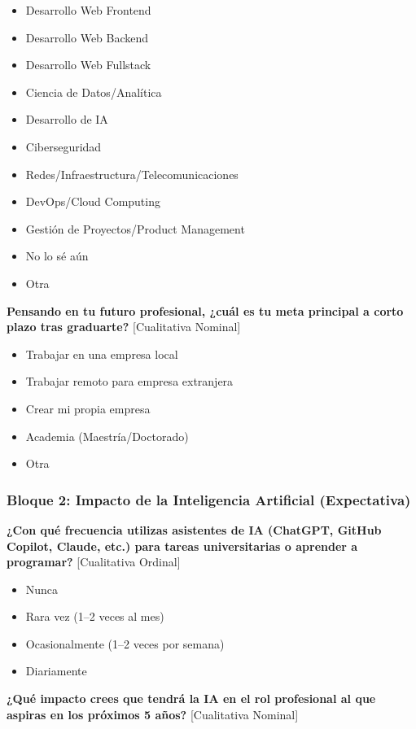 \begin{itemize}
    \item Desarrollo Web Frontend
    \item Desarrollo Web Backend
    \item Desarrollo Web Fullstack
    \item Ciencia de Datos/Analítica
    \item Desarrollo de IA
    \item Ciberseguridad
    \item Redes/Infraestructura/Telecomunicaciones
    \item DevOps/Cloud Computing
    \item Gestión de Proyectos/Product Management
    \item No lo sé aún
    \item Otra
\end{itemize}

\textbf{Pensando en tu futuro profesional, ¿cuál es tu meta principal a corto plazo tras graduarte?} [Cualitativa Nominal]

\begin{itemize}
    \item Trabajar en una empresa local
    \item Trabajar remoto para empresa extranjera
    \item Crear mi propia empresa
    \item Academia (Maestría/Doctorado)
    \item Otra
\end{itemize}

\subsubsection*{Bloque 2: Impacto de la Inteligencia Artificial (Expectativa)}

\textbf{¿Con qué frecuencia utilizas asistentes de IA (ChatGPT, GitHub Copilot, Claude, etc.) para tareas universitarias o aprender a programar?} [Cualitativa Ordinal]

\begin{itemize}
    \item Nunca
    \item Rara vez (1--2 veces al mes)
    \item Ocasionalmente (1--2 veces por semana)
    \item Diariamente
\end{itemize}

\textbf{¿Qué impacto crees que tendrá la IA en el rol profesional al que aspiras en los próximos 5 años?} [Cualitativa Nominal]

